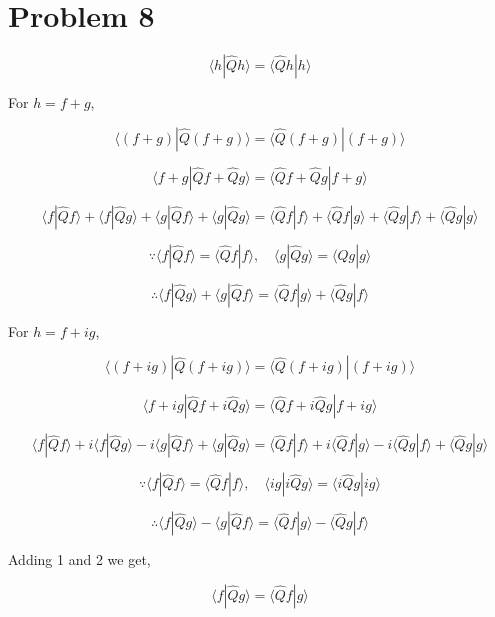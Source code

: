 \documentclass[12pt]{article}
\begin{document}
\section{Problem 8}

\[
    \langle h | \hat{Q} h \rangle = \langle \hat{Q}  h | h \rangle
\]

For \( h = f + g \),

\[
    \langle (f + g) | \hat{Q} (f + g) \rangle = \langle \hat{Q}  (f + g) | (f + g) \rangle
\]

\[
    \langle f + g | \hat{Q}f + \hat{Q}g \rangle = \langle \hat{Q}f + \hat{Q}g | f + g \rangle
\]

\[
    \langle f | \hat{Q}f \rangle
    + \langle f | \hat{Q}g \rangle
    + \langle g | \hat{Q}f \rangle
    + \langle g | \hat{Q}g \rangle
    =
    \langle \hat{Q}f | f \rangle
    + \langle \hat{Q}f | g \rangle
    + \langle \hat{Q}g | f \rangle
    + \langle \hat{Q}g | g \rangle
\]

\[
    \because \langle f | \hat{Q}f \rangle = \langle \hat{Q}f | f \rangle, \quad
    \langle g | \hat{Q}g \rangle = \langle \hat{Q}g | g \rangle
\]

\[
    \therefore
    \langle f | \hat{Q}g \rangle
    + \langle g | \hat{Q}f \rangle
    =
    \langle \hat{Q}f | g \rangle
    + \langle \hat{Q}g | f \rangle \tag{1}
\]

For \( h = f + ig \),

\[
    \langle (f + ig) | \hat{Q} (f + ig) \rangle = \langle \hat{Q}  (f + ig) | (f + ig) \rangle
\]

\[
    \langle f + ig | \hat{Q}f + i\hat{Q}g \rangle = \langle \hat{Q}f + i\hat{Q}g | f + ig \rangle
\]

\[
    \langle f | \hat{Q}f \rangle
    + i\langle f | \hat{Q}g \rangle
    - i\langle g | \hat{Q}f \rangle
    + \langle g | \hat{Q}g \rangle
    =
    \langle \hat{Q}f | f \rangle
    + i\langle \hat{Q}f | g \rangle
    - i\langle \hat{Q}g | f \rangle
    + \langle \hat{Q}g | g \rangle
\]

\[
    \because \langle f | \hat{Q}f \rangle = \langle \hat{Q}f | f \rangle, \quad
    \langle ig | i\hat{Q}g \rangle = \langle i\hat{Q}g | ig \rangle
\]

\[
    \therefore
    \langle f | \hat{Q}g \rangle
    - \langle g | \hat{Q}f \rangle
    =
    \langle \hat{Q}f | g \rangle
    - \langle \hat{Q}g | f \rangle \tag{2}
\]

Adding 1 and 2 we get,

\[
    \langle f | \hat{Q}g \rangle = \langle \hat{Q}f | g \rangle
\]

\newpage


\nocite{El-Deeb_PEU-323_Assignments}
\nocite{griffiths2018introduction}
\end{document}
